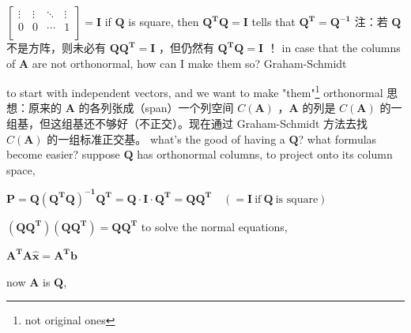 \documentclass[12pt, a4paper]{article}
\begin{document}
{\begin{math}
\begin{bmatrix}
		\vdots & \vdots & \ddots & \vdots \\
		0 & 0 & \cdots & 1 \\
	\end{bmatrix}
	 = 
	{\mathbf{I}}
\end{math}
\newline
if ${\mathbf{Q}}$ is square, then ${\mathbf{Q^{T}}}{\mathbf{Q}} = {\mathbf{I}}$ tells that ${\mathbf{Q^{T}}} = {\mathbf{Q^{-1}}}$
\newline
{\textcolor{anhao-scarlet}{注：若 ${\mathbf{Q}}$ 不是方阵，则未必有 ${\mathbf{Q}}{\mathbf{Q^{T}}} = {\mathbf{I}}$ ，但仍然有 ${\mathbf{Q^{T}}}{\mathbf{Q}} = {\mathbf{I}}$ ！}}
\vspace{31pt}
\newline
in case that the columns of ${\mathbf{A}}$ are not orthonormal, how can I make them so?
\newline
{\textcolor{anhao-scarlet}{Graham-Schmidt}}
\par to start with independent vectors, and we want to make "them"\footnote{not original ones} orthonormal
\newline
{\textcolor{anhao-scarlet}{思想：原来的 ${\mathbf{A}}$ 的各列张成（span）一个列空间 $C({\mathbf{A}})$ ，${\mathbf{A}}$ 的列是 $C({\mathbf{A}})$ 的一组基，但这组基还不够好（不正交）。现在通过 Graham-Schmidt 方法去找 $C({\mathbf{A}})$ 的一组标准正交基。}}
\vspace{31pt}
\newline
what's the good of having a ${\mathbf{Q}}$? what formulas become easier?
\newline
suppose ${\mathbf{Q}}$ has orthonormal columns, to project onto its column space, 
\par 
\begin{math}
	{\mathbf{P}} = {\mathbf{Q}}({\mathbf{Q^{T}}}{\mathbf{Q}})^{\mathbf{-1}}{\mathbf{Q^{T}}} = 
	{\mathbf{Q}}\cdot{\mathbf{I}}\cdot{\mathbf{Q^{T}}} = 
	{\mathbf{Q}}{\mathbf{Q^{T}}} 
	\quad ( = {\mathbf{I}} \ {\text{if}} \ {\mathbf{Q}} \ {\text{is square}} )
\end{math}
\par 
\begin{math}
	({\mathbf{Q}}{\mathbf{Q^{T}}})({\mathbf{Q}}{\mathbf{Q^{T}}}) = {\mathbf{Q}}{\mathbf{Q^{T}}}
\end{math}
\newline
to solve the normal equations,
\par ${\mathbf{A^{T}}}{\mathbf{A}}{\mathbf{\hat{x}}} = {\mathbf{A^{T}}}{\mathbf{b}}$
\par now ${\mathbf{A}}$ is ${\mathbf{Q}}$,
}
\end{document}
